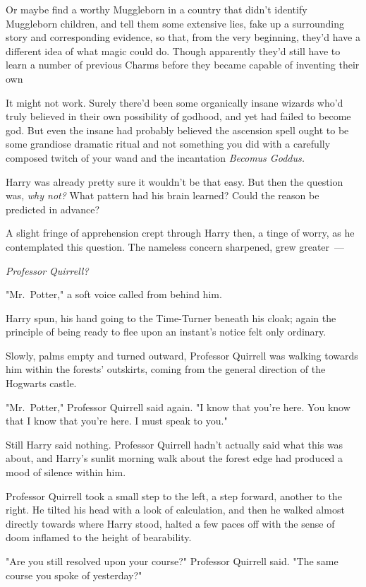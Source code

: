 Or maybe find a worthy Muggleborn in a country that didn't identify Muggleborn
children, and tell them some extensive lies, fake up a surrounding story and
corresponding evidence, so that, from the very beginning, they'd have a
different idea of what magic could do. Though apparently they'd still have to
learn a number of previous Charms before they became capable of inventing their
own{\el}

It might not work. Surely there'd been some organically insane wizards who'd
truly believed in their own possibility of godhood, and yet had failed to
become god. But even the insane had probably believed the ascension spell ought
to be some grandiose dramatic ritual and not something you did with a carefully
composed twitch of your wand and the incantation \emph{Becomus Goddus.}

Harry was already pretty sure it wouldn't be that easy. But then the question
was, \emph{why not?} What pattern had his brain learned? Could the reason be
predicted in advance?

A slight fringe of apprehension crept through Harry then, a tinge of worry, as
he contemplated this question. The nameless concern sharpened, grew greater~---

\emph{Professor Quirrell?}

"Mr.~Potter," a soft voice called from behind him.

Harry spun, his hand going to the Time-Turner beneath his cloak; again the
principle of being ready to flee upon an instant's notice felt only ordinary.

Slowly, palms empty and turned outward, Professor Quirrell was walking towards
him within the forests' outskirts, coming from the general direction of the
Hogwarts castle.

"Mr.~Potter," Professor Quirrell said again. "I know that you're here. You know
that I know that you're here. I must speak to you."

Still Harry said nothing. Professor Quirrell hadn't actually said what this was
about, and Harry's sunlit morning walk about the forest edge had produced a
mood of silence within him.

Professor Quirrell took a small step to the left, a step forward, another to
the right. He tilted his head with a look of calculation, and then he walked
almost directly towards where Harry stood, halted a few paces off with the
sense of doom inflamed to the height of bearability.

"Are you still resolved upon your course?" Professor Quirrell said. "The same
course you spoke of yesterday?"

